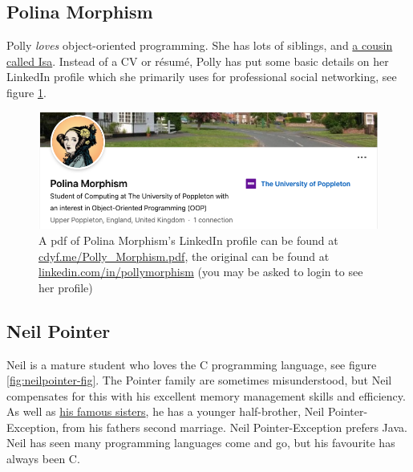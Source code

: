 \documentclass[
]{book}
\begin{document}
\hypertarget{polly-morphism}{%
\subsection{Polina Morphism}\label{polly-morphism}}

Polly \emph{loves} object-oriented programming. She has lots of siblings, and \href{https://en.wikipedia.org/wiki/Isomorphism}{a cousin called Isa}. Instead of a CV or résumé, Polly has put some basic details on her LinkedIn profile which she primarily uses for professional social networking, see figure \ref{fig:polly-fig}.

\begin{figure}

{\centering \includegraphics[width=1\linewidth]{images/polly-morphism} 

}

\caption{A pdf of Polina Morphism's LinkedIn profile can be found at \href{https://www.cdyf.me/Polly_Morphism.pdf}{cdyf.me/Polly\_Morphism.pdf}, the original can be found at \href{https://www.linkedin.com/in/pollymorphism/}{linkedin.com/in/pollymorphism} (you may be asked to login to see her profile)}\label{fig:polly-fig}
\end{figure}



\hypertarget{neil-pointer}{%
\subsection{Neil Pointer}\label{neil-pointer}}

Neil is a mature student who loves the C programming language, see figure \ref{fig:neilpointer-fig}. The Pointer family are sometimes misunderstood, but Neil compensates for this with his excellent memory management skills and efficiency. As well as \href{https://en.wikipedia.org/wiki/The_Pointer_Sisters}{his famous sisters}, he has a younger half-brother, Neil Pointer-Exception, from his fathers second marriage. Neil Pointer-Exception prefers Java. Neil has seen many programming languages come and go, but his favourite has always been C.
\end{document}
